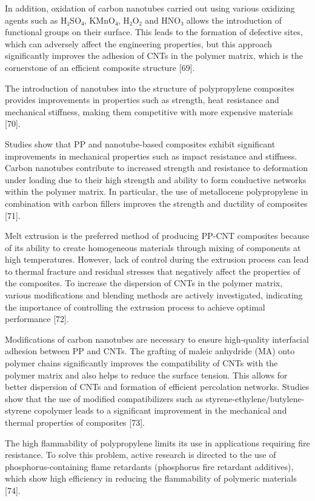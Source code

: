 In addition, oxidation of carbon nanotubes carried out using various
oxidizing agents such as H₂SO₄, KMnO₄, H₂O₂ and HNO₃ allows the
introduction of functional groups on their surface. This leads to the
formation of defective sites, which can adversely affect the engineering
properties, but this approach significantly improves the adhesion of
CNTs in the polymer matrix, which is the cornerstone of an efficient
composite structure {[}69{]}.

The introduction of nanotubes into the structure of polypropylene
composites provides improvements in properties such as strength, heat
resistance and mechanical stiffness, making them competitive with more
expensive materials {[}70{]}.

Studies show that PP and nanotube-based composites exhibit significant
improvements in mechanical properties such as impact resistance and
stiffness. Carbon nanotubes contribute to increased strength and
resistance to deformation under loading due to their high strength and
ability to form conductive networks within the polymer matrix. In
particular, the use of metallocene polypropylene in combination with
carbon fillers improves the strength and ductility of composites
{[}71{]}.

Melt extrusion is the preferred method of producing PP-CNT composites
because of its ability to create homogeneous materials through mixing of
components at high temperatures. However, lack of control during the
extrusion process can lead to thermal fracture and residual stresses
that negatively affect the properties of the composites. To increase the
dispersion of CNTs in the polymer matrix, various modifications and
blending methods are actively investigated, indicating the importance of
controlling the extrusion process to achieve optimal performance
{[}72{]}.

Modifications of carbon nanotubes are necessary to ensure high-quality
interfacial adhesion between PP and CNTs. The grafting of maleic
anhydride (MA) onto polymer chains significantly improves the
compatibility of CNTs with the polymer matrix and also helps to reduce
the surface tension. This allows for better dispersion of CNTs and
formation of efficient percolation networks. Studies show that the use
of modified compatibilizers such as styrene-ethylene/butylene-styrene
copolymer leads to a significant improvement in the mechanical and
thermal properties of composites {[}73{]}.

The high flammability of polypropylene limits its use in applications
requiring fire resistance. To solve this problem, active research is
directed to the use of phosphorus-containing flame retardants
(phosphorus fire retardant additives), which show high efficiency in
reducing the flammability of polymeric materials {[}74{]}.


